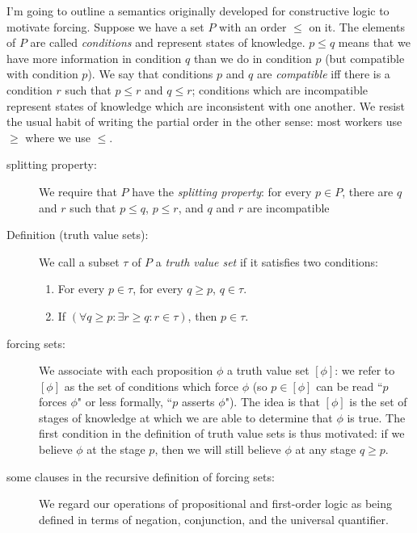 \documentclass[12pt]{book}
\begin{document}
I'm going to outline a semantics originally developed for constructive logic to motivate forcing.  Suppose we have a set $P$ with an order $\leq$ on it.
The elements of $P$ are called {\em conditions} and represent states of knowledge.  $p \leq q$ means that we have more information in condition $q$ than we do in condition $p$ (but compatible with condition $p$).  We say that conditions $p$ and $q$ are {\em compatible\/} iff there is a condition $r$ such that $p \leq r$ and $q \leq r$;  conditions which are incompatible represent states of knowledge which are inconsistent with one another.
We resist the usual habit of writing the partial order in the other sense:  most workers use $\geq$ where we use $\leq$.

\begin{description}

\item[splitting property:]  We require that $P$ have the {\em splitting property\/}:  for every $p \in P$, there are $q$ and $r$ such that $p \leq q$, $p \leq r$, and $q$ and $r$ are incompatible

\item[Definition (truth value sets):]  We call a subset $\tau$ of $P$ a {\em truth value set\/} if it satisfies two conditions:

\begin{enumerate}

\item For every $p \in \tau$, for every $q \geq p$, $q \in \tau$.

\item If $(\forall q \geq p: \exists r \geq q:r \in \tau)$, then $p \in \tau$.

\end{enumerate}

\item[forcing sets:]  We associate with each proposition $\phi$ a truth value set $[\phi]$:  we refer to $[\phi]$ as the set of conditions which force $\phi$ (so $p \in [\phi]$ can be read ``$p$ forces $\phi$" or less formally, ``$p$ asserts $\phi$").  The idea is that $[\phi]$ is the set of stages of knowledge at which we are able to determine that $\phi$ is true.
The first condition in the definition of truth value sets is thus motivated:  if we believe $\phi$ at the stage $p$, then we will still believe $\phi$ at any stage $q \geq p$.

\item[some clauses in the recursive definition of forcing sets:]  We regard our operations of propositional and first-order logic as being defined
in terms of negation, conjunction, and the universal quantifier.


\end{description}
\end{document}

